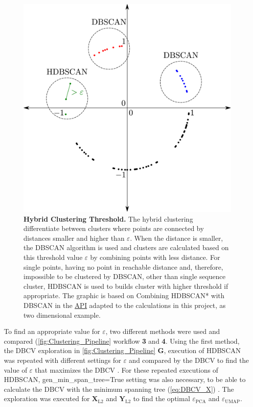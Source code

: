 \begin{figure}[!hbt]
    \centering
    \includegraphics[width=\textwidth]{Graphics/Hybrid.pdf}
    \caption[Hybrid Clustering Threshold]{\textbf{Hybrid Clustering Threshold.} The hybrid clustering differentiate between clusters where points are connected by distances smaller and higher than $\varepsilon$. When the distance is smaller, the \gls{DBSCAN} algorithm is used and clusters are calculated based on this threshold value $\varepsilon$ by combining points with less distance. For single points, having no point in reachable distance and, therefore, impossible to be clustered by \gls{DBSCAN}, other than single sequence cluster, \gls{HDBSCAN} is used to builds cluster with higher threshold if appropriate. The graphic is based on \glqq Combining HDBSCAN* with DBSCAN\grqq{} in the \href{https://hdbscan.readthedocs.io/en/latest/api.html}{API} adapted to the calculations in this project, as two dimensional example.}
    \label{fig:Hybrid}
\end{figure}

To find an appropriate value for $\varepsilon$, two different methods were used and compared (\autoref{fig:Clustering_Pipeline} workflow \textsf{\textbf{3}} and \textsf{\textbf{4}}. Using the first method, the \gls{DBCV} exploration in \autoref{fig:Clustering_Pipeline} \textsf{\textbf{G}}, execution of \gls{HDBSCAN} was repeated with different settings for $\varepsilon$ and compared by the \gls{DBCV} to find the value of $\varepsilon$ that maximizes the \gls{DBCV} \autocite{moulavi_density-based_2014}. For these repeated executions of \gls{HDBSCAN}, \colorbox{backcolour}{gen\_min\_span\_tree=True} setting was also necessary, to be able to calculate the \gls{DBCV} with the minimum spanning tree (\autoref{eq:DBCV_X}) \autocite{moulavi_density-based_2014, gower_minimum_1969}. The exploration was executed for $\mathbf{X}_{\text{L2}}$ and $\mathbf{Y}_{\text{L2}}$ to find the optimal $\varepsilon_{\text{PCA}}$ and $\varepsilon_{\text{UMAP}}$.

